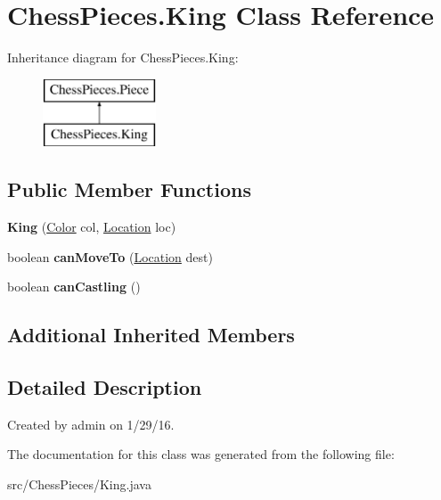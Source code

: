 \hypertarget{class_chess_pieces_1_1_king}{}\section{Chess\+Pieces.\+King Class Reference}
\label{class_chess_pieces_1_1_king}
Inheritance diagram for Chess\+Pieces.\+King\+:\begin{figure}[H]
\begin{center}
\leavevmode
\includegraphics[height=2.000000cm]{class_chess_pieces_1_1_king}
\end{center}
\end{figure}
\subsection*{Public Member Functions}
\begin{DoxyCompactItemize}
\item 
{\bfseries King} (\hyperlink{enum_chess_pieces_1_1_color}{Color} col, \hyperlink{class_chess_pieces_1_1_location}{Location} loc)\hypertarget{class_chess_pieces_1_1_king_a6853b5c75799d9f4662950a9200555fd}{}\label{class_chess_pieces_1_1_king_a6853b5c75799d9f4662950a9200555fd}

\item 
boolean {\bfseries can\+Move\+To} (\hyperlink{class_chess_pieces_1_1_location}{Location} dest)\hypertarget{class_chess_pieces_1_1_king_ae56ded315887600afdf86c03cfae3ae9}{}\label{class_chess_pieces_1_1_king_ae56ded315887600afdf86c03cfae3ae9}

\item 
boolean {\bfseries can\+Castling} ()\hypertarget{class_chess_pieces_1_1_king_a61aa63d17ac310eec5d49c99d30f352d}{}\label{class_chess_pieces_1_1_king_a61aa63d17ac310eec5d49c99d30f352d}

\end{DoxyCompactItemize}
\subsection*{Additional Inherited Members}


\subsection{Detailed Description}
Created by admin on 1/29/16. 

The documentation for this class was generated from the following file\+:\begin{DoxyCompactItemize}
\item 
src/\+Chess\+Pieces/King.\+java\end{DoxyCompactItemize}
